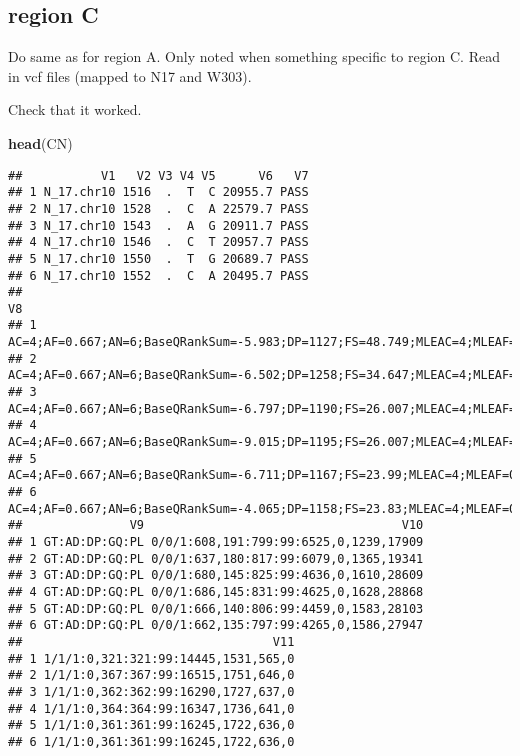 \documentclass[
]{article}
\newenvironment{Shaded}{\begin{snugshade}}{\end{snugshade}}
\newcommand{\FunctionTok}[1]{\textcolor[rgb]{0.13,0.29,0.53}{\textbf{#1}}}
\newcommand{\NormalTok}[1]{#1}
\begin{document}
\hypertarget{region-c}{%
\subsection{region C}\label{region-c}}

Do same as for region A. Only noted when something specific to region C.
Read in vcf files (mapped to N17 and W303).

Check that it worked.

\begin{Shaded}
\begin{Highlighting}[]
\FunctionTok{head}\NormalTok{(CN)}
\end{Highlighting}
\end{Shaded}

\begin{verbatim}
##           V1   V2 V3 V4 V5      V6   V7
## 1 N_17.chr10 1516  .  T  C 20955.7 PASS
## 2 N_17.chr10 1528  .  C  A 22579.7 PASS
## 3 N_17.chr10 1543  .  A  G 20911.7 PASS
## 4 N_17.chr10 1546  .  C  T 20957.7 PASS
## 5 N_17.chr10 1550  .  T  G 20689.7 PASS
## 6 N_17.chr10 1552  .  C  A 20495.7 PASS
##                                                                                                                                              V8
## 1 AC=4;AF=0.667;AN=6;BaseQRankSum=-5.983;DP=1127;FS=48.749;MLEAC=4;MLEAF=0.667;MQ=41.33;MQRankSum=-12.33;QD=18.71;ReadPosRankSum=4.68;SOR=0.146
## 2 AC=4;AF=0.667;AN=6;BaseQRankSum=-6.502;DP=1258;FS=34.647;MLEAC=4;MLEAF=0.667;MQ=41.47;MQRankSum=-12.19;QD=19.07;ReadPosRankSum=5.89;SOR=0.105
## 3 AC=4;AF=0.667;AN=6;BaseQRankSum=-6.797;DP=1190;FS=26.007;MLEAC=4;MLEAF=0.667;MQ=41.53;MQRankSum=-11.98;QD=17.62;ReadPosRankSum=8.24;SOR=0.148
## 4 AC=4;AF=0.667;AN=6;BaseQRankSum=-9.015;DP=1195;FS=26.007;MLEAC=4;MLEAF=0.667;MQ=41.54;MQRankSum=-12.05;QD=17.54;ReadPosRankSum=7.58;SOR=0.152
## 5  AC=4;AF=0.667;AN=6;BaseQRankSum=-6.711;DP=1167;FS=23.99;MLEAC=4;MLEAF=0.667;MQ=41.53;MQRankSum=-11.79;QD=17.73;ReadPosRankSum=7.51;SOR=0.154
## 6    AC=4;AF=0.667;AN=6;BaseQRankSum=-4.065;DP=1158;FS=23.83;MLEAC=4;MLEAF=0.667;MQ=41.52;MQRankSum=-11.74;QD=17.7;ReadPosRankSum=6.7;SOR=0.158
##               V9                                    V10
## 1 GT:AD:DP:GQ:PL 0/0/1:608,191:799:99:6525,0,1239,17909
## 2 GT:AD:DP:GQ:PL 0/0/1:637,180:817:99:6079,0,1365,19341
## 3 GT:AD:DP:GQ:PL 0/0/1:680,145:825:99:4636,0,1610,28609
## 4 GT:AD:DP:GQ:PL 0/0/1:686,145:831:99:4625,0,1628,28868
## 5 GT:AD:DP:GQ:PL 0/0/1:666,140:806:99:4459,0,1583,28103
## 6 GT:AD:DP:GQ:PL 0/0/1:662,135:797:99:4265,0,1586,27947
##                                   V11
## 1 1/1/1:0,321:321:99:14445,1531,565,0
## 2 1/1/1:0,367:367:99:16515,1751,646,0
## 3 1/1/1:0,362:362:99:16290,1727,637,0
## 4 1/1/1:0,364:364:99:16347,1736,641,0
## 5 1/1/1:0,361:361:99:16245,1722,636,0
## 6 1/1/1:0,361:361:99:16245,1722,636,0
\end{verbatim}
\end{document}
